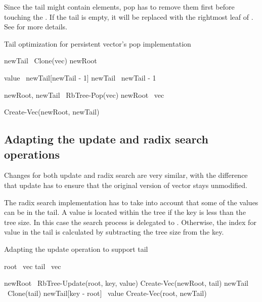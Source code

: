 Since the tail might contain elements, pop has to remove them first before touching the \rbtree. If the tail is empty, it will be replaced with the rightmost leaf of \rbtree. See  for more details.

\begin{listing}[ht!]
    \caption{Tail optimization for persistent vector’s pop implementation}
    \label{lst:pvec-pop}

    \begin{algorithmic}

        \State newTail \la\ Clone(vec)
        \State newRoot \la\ \nil{}

        \State value \la\ newTail[newTail - 1]
        \State newTail \la\ newTail - 1

            \State newRoot, newTail \la\ RbTree-Pop(vec)
        \Else
            \State newRoot \la\ vec
        \EndIf

        \State \Return Create-Vec(newRoot, newTail)
        \EndFunction
    \end{algorithmic}
\end{listing}

\subsection*{Adapting the update and radix search operations}
Changes for both update and radix search are very similar, with the difference that update has to ensure that the original version of vector stays unmodified.

The radix search implementation has to take into account that some of the values can be in the tail. A value is located within the tree if the key is less than the tree size. In this case the search process is delegated to \rbtree. Otherwise, the index for value in the tail is calculated by subtracting the tree size from the key.

\begin{listing}[ht!]
    \caption{Adapting the update operation to support tail}
    \label{lst:pvec-update}

    \begin{algorithmic}

        \State root \la\ vec
        \State tail \la\ vec

            \State newRoot \la\ RbTree-Update(root, key, value)
            \State \Return Create-Vec(newRoot, tail)
        \Else
            \State newTail \la\ Clone(tail)
            \State newTail[key - root] \la\ value
            \State \Return Create-Vec(root, newTail)
        \EndIf
        \EndFunction
    \end{algorithmic}
\end{listing}

